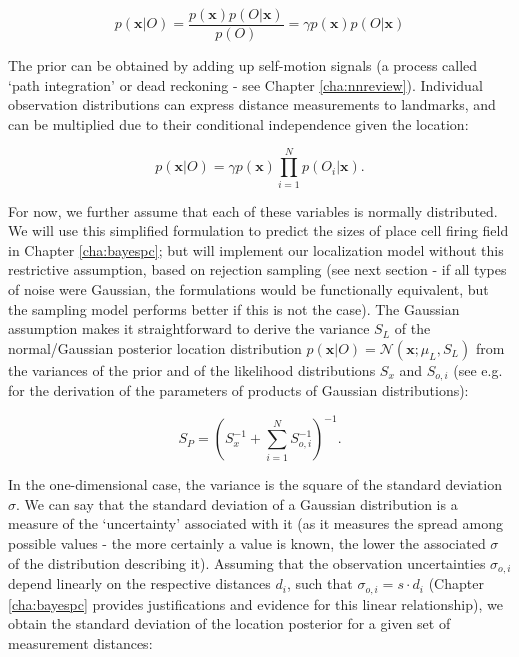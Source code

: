 \begin{equation}\label{bayes1}
p( \bm x | O ) = \frac{p( \bm x ) p( O | \bm x )}{p(O)} = \gamma p( \bm x ) p( O | \bm x )
\end{equation}

The prior can be obtained by adding up self-motion signals (a process called `path integration' or dead reckoning - see Chapter \ref{cha:nnreview}). Individual observation distributions can express distance measurements to landmarks, and can be multiplied due to their conditional independence given the location:

\begin{equation}\label{bayes2}
p( \bm x | O ) = \gamma p( \bm x ) \prod_{i=1}^{N} p( O_i | \bm x ).
\end{equation}

For now, we further assume that each of these variables is normally distributed. We will use this simplified formulation to predict the sizes of place cell firing field in Chapter \ref{cha:bayespc}; but will implement our localization model without this restrictive assumption, based on rejection sampling (see next section - if all types of noise were Gaussian, the formulations would be functionally equivalent, but the sampling model performs better if this is not the case). The Gaussian assumption makes it straightforward to derive the variance $S_L$ of the normal/Gaussian posterior location distribution $p( \bm x | O ) = \mathcal{N}(\bm x ; \mu_L, S_L)$ from the variances of the prior and of the likelihood distributions $S_x$ and $S_{o,i}$ (see e.g. \cite{wu2004properties} for the derivation of the parameters of products of Gaussian distributions):

\begin{equation}\label{bayes3}
S_{P}=(S_x^{-1}+\sum_{i=1}^{N} S_{o,i}^{-1})^{-1}.
\end{equation}

In the one-dimensional case, the variance is the square of the standard deviation $\sigma$. We can say that the standard deviation of a Gaussian distribution is a measure of the `uncertainty' associated with it (as it measures the spread among possible values - the more certainly a value is known, the lower the associated $\sigma$ of the distribution describing it). Assuming that the observation uncertainties $\sigma_{o,i}$ depend linearly on the respective distances $d_{i}$, such that $\sigma_{o,i}=s \cdot d_{i}$ (Chapter \ref{cha:bayespc} provides justifications and evidence for this linear relationship), we obtain the standard deviation of the location posterior for a given set of measurement distances:

